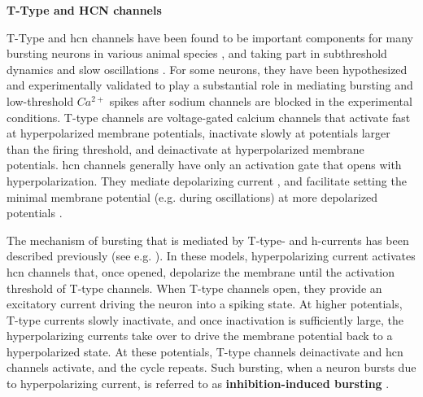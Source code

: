 \documentclass[../main.tex]{subfiles}
\begin{document}
\noindent\textbf{T-Type and HCN channels}

T-Type and \gls{hcn} channels have been found to be important components for many bursting neurons in various animal species \parencite{amarilloInterplaySevenSubthreshold2014,vickstromTTypeCalciumChannels2020,destexheModelInwardCurrent1993},
and taking part in subthreshold dynamics and slow oscillations \parencite{wangMultipleDynamicalModes1994}.
For some neurons, they have been hypothesized and experimentally validated to play a substantial role in mediating bursting and low-threshold $Ca^{2+}$ spikes after sodium channels are blocked in the experimental conditions. %
T-type channels are voltage-gated calcium channels that activate fast at hyperpolarized membrane potentials, inactivate slowly at potentials larger than the firing threshold, and deinactivate at hyperpolarized membrane potentials. \gls{hcn} channels generally have only an activation gate that opens with hyperpolarization. They mediate depolarizing current \parencite{destexheModelInwardCurrent1993}, and facilitate setting the minimal membrane potential (e.g. during oscillations) at more depolarized potentials \parencite{liuMultipleConductancesCooperatively2008}.

The mechanism of bursting that is mediated by T-type- and h-currents has been described previously (see e.g. \parencite{liuMultipleConductancesCooperatively2008}). In these models, hyperpolarizing current activates \gls{hcn} channels that, once opened, depolarize the membrane until the activation threshold of T-type channels. When T-type channels open, they provide an excitatory current driving the neuron into a spiking state.
At higher potentials, T-type currents slowly inactivate, and once inactivation is sufficiently large, the hyperpolarizing currents take over to drive the membrane potential back to a hyperpolarized state.
At these potentials, T-type channels deinactivate and \gls{hcn} channels activate, and the cycle repeats. Such bursting, when a neuron bursts due to hyperpolarizing current, is referred to as \textbf{inhibition-induced bursting} \parencite{izhikevichDynamicalSystemsNeuroscience2006}.
\end{document}
